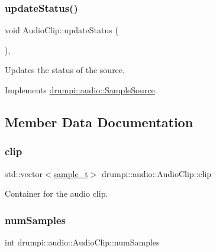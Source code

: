 \subsubsection{\texorpdfstring{update\+Status()}{updateStatus()}}
{\footnotesize\ttfamily void Audio\+Clip\+::update\+Status (\begin{DoxyParamCaption}{ }\end{DoxyParamCaption})\hspace{0.3cm}{\ttfamily [override]}, {\ttfamily [virtual]}}

Updates the status of the source. 

Implements \hyperlink{classdrumpi_1_1audio_1_1SampleSource_aff9beb7031bc5af424dccc525be5e9d3}{drumpi\+::audio\+::\+Sample\+Source}.



\subsection{Member Data Documentation}
\mbox{\label{classdrumpi_1_1audio_1_1AudioClip_a3d99c707ac474917167a9936e09e620a}} 
\subsubsection{\texorpdfstring{clip}{clip}}
{\footnotesize\ttfamily std\+::vector$<$\hyperlink{namespacedrumpi_1_1audio_aca0bdc9164f87b72057e284442abab6e}{sample\+\_\+t}$>$ drumpi\+::audio\+::\+Audio\+Clip\+::clip\hspace{0.3cm}{\ttfamily [private]}}

Container for the audio clip. \mbox{\label{classdrumpi_1_1audio_1_1AudioClip_a5ee7a6ff9e98c5c3f72ec72405d96e58}} 
\subsubsection{\texorpdfstring{num\+Samples}{numSamples}}
{\footnotesize\ttfamily int drumpi\+::audio\+::\+Audio\+Clip\+::num\+Samples\hspace{0.3cm}{\ttfamily [private]}}

